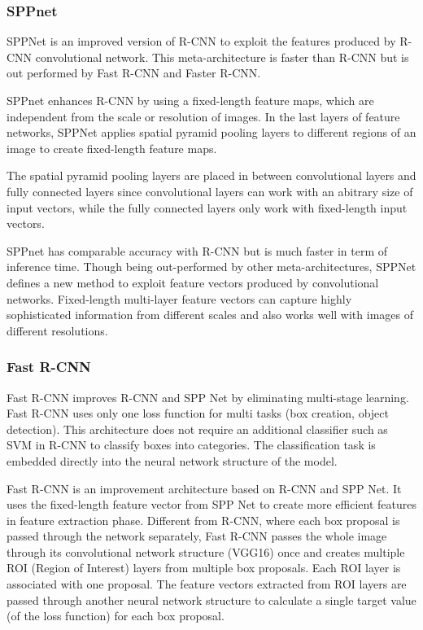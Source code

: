 \documentclass[conference]{IEEEtran}
\begin{document}
\subsubsection{SPPnet}
SPPNet is an improved version of R-CNN to exploit the features produced by R-CNN convolutional network. This meta-architecture is faster than R-CNN but is out performed by Fast R-CNN and Faster R-CNN.

SPPnet enhances R-CNN by using a fixed-length feature maps, which are independent from the scale or resolution of images. In the last layers of feature networks, SPPNet applies spatial pyramid pooling layers to different regions of an image to create fixed-length feature maps.

The spatial pyramid pooling layers are placed in between convolutional layers and fully connected layers since convolutional layers can work with an abitrary size of input vectors, while the fully connected layers only work with fixed-length input vectors.

SPPnet has comparable accuracy with R-CNN but is much faster in term of inference time. Though being out-performed by other meta-architectures, SPPNet defines a new method to exploit feature vectors produced by convolutional networks. Fixed-length multi-layer feature vectors can capture highly sophisticated information from different scales and also works well with images of different resolutions.

\subsubsection{Fast R-CNN}
Fast R-CNN improves R-CNN and SPP Net by eliminating multi-stage learning. Fast R-CNN uses only one loss function for multi tasks (box creation, object detection). This architecture does not require an additional classifier such as SVM in R-CNN to classify boxes into categories. The classification task is embedded directly into the neural network structure of the model.

Fast R-CNN is an improvement architecture based on R-CNN and SPP Net. It uses the fixed-length feature vector from SPP Net to create more efficient features in feature extraction phase. Different from R-CNN, where each box proposal is passed through the network separately, Fast R-CNN passes the whole image through its convolutional network structure (VGG16) once and creates multiple ROI (Region of Interest) layers from multiple box proposals. Each ROI layer is associated with one proposal. The feature vectors extracted from ROI layers are passed through another neural network structure to calculate a single target value (of the loss function) for each box proposal.
\end{document}
